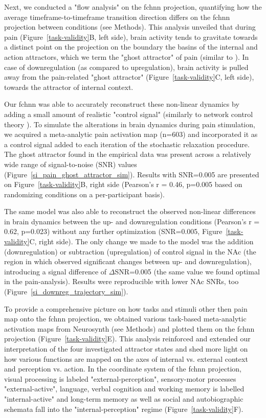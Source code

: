 \documentclass{article}
\begin{document}
Next, we conducted a "flow analysis" on the \acrshort{fchnn} projection, quantifying how the average timeframe-to-timeframe transition direction differs on the \acrshort{fchnn} projection between conditions (see Methods).
This analysis unveiled that during pain (Figure~\ref{task-validity}B, left side), brain activity tends to gravitate towards a distinct point on the projection on the boundary the basins of the internal and action attractors, which we term the "ghost attractor" of pain (similar to \cite{vohryzek2020ghost}). In case of downregulation (as compared to upregulation), brain activity is pulled away from the pain-related "ghost attractor" (Figure~\ref{task-validity}C, left side), towards the attractor of internal context.

Our \acrshort{fchnn} was able to accurately reconstruct these non-linear dynamics by adding a small amount of realistic "control signal" (similarly to network control theory \citet{liu2011controllability, gu2015controllability}). To simulate the alterations in brain dynamics during pain stimulation, we acquired a meta-analytic pain activation map \citep{zunhammer2021meta} (n=603) and incorporated it as a control signal added to each iteration of the stochastic relaxation procedure. The ghost attractor found in the empirical data was present across a relatively wide range of signal-to-noise (SNR) values (Figure~\ref{si_pain_ghost_attractor_sim}). Results with SNR=0.005 are presented on Figure~\ref{task-validity}B, right side (Pearson's r = 0.46, p=0.005 based on randomizing conditions on a per-participant basis).

The same model was also able to reconstruct the observed non-linear differences in brain dynamics between the up- and downregulation conditions (Pearson's r = 0.62, p=0.023) without any further optimization (SNR=0.005,
Figure~\ref{task-validity}C, right side). The only change we made to the model was the addition (downregulation) or
subtraction (upregulation) of control signal in the NAc (the region in which \citep{woo2015distinct} observed significant changes between up- and downregulation), introducing a signal difference of $\Delta$SNR=0.005 (the same value we found optimal in the pain-analysis). Results were reproducible with lower NAc SNRs, too (Figure~\ref{si_downreg_trajectory_sim}).

To provide a comprehensive picture on how tasks and stimuli other then pain map onto the \acrshort{fchnn} projection, we obtained various task-based meta-analytic activation maps from Neurosynth (see Methods) and plotted them on the \acrshort{fchnn} projection (Figure~\ref{task-validity}E). This analysis reinforced and extended our interpretation of the four investigated attractor states and shed more light on how various functions are mapped on the axes of internal vs. external context and perception vs. action.
In the coordinate system of the \acrshort{fchnn} projection, visual processing is labeled "external-perception", sensory-motor processes "external-active", language, verbal cognition and working memory is labelled "internal-active" and long-term memory as well as social and autobiographic schemata fall into the "internal-perception" regime (Figure~\ref{task-validity}F).
\end{document}
